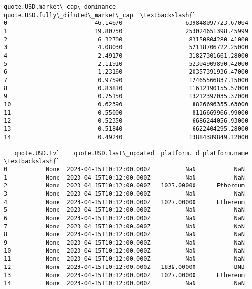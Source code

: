 \documentclass[11pt]{article}
\begin{document}
\begin{tcolorbox}[breakable, size=fbox, boxrule=.5pt, pad at break*=1mm, opacityfill=0]
\begin{Verbatim}[commandchars=\\\{\}]
    quote.USD.market\_cap\_dominance  quote.USD.fully\_diluted\_market\_cap  \textbackslash{}
0                         46.14670                  639848097723.67004
1                         19.80750                  253024651398.45999
2                          6.32700                   83150804280.41000
3                          4.08030                   52118706722.25000
4                          2.49170                   31827301661.28000
5                          2.11910                   52304909890.42000
6                          1.23160                   20357391936.47000
7                          0.97590                   12465566837.15000
8                          0.83810                   11612190155.57000
9                          0.75150                   13212397035.37000
10                         0.62390                    8826696355.63000
11                         0.55000                    8116669966.99000
12                         0.52350                    6686244056.93000
13                         0.51840                    6622404295.28000
14                         0.49240                   13884389849.12000

   quote.USD.tvl    quote.USD.last\_updated  platform.id platform.name  \textbackslash{}
0           None  2023-04-15T10:12:00.000Z          NaN           NaN
1           None  2023-04-15T10:12:00.000Z          NaN           NaN
2           None  2023-04-15T10:12:00.000Z   1027.00000      Ethereum
3           None  2023-04-15T10:12:00.000Z          NaN           NaN
4           None  2023-04-15T10:12:00.000Z   1027.00000      Ethereum
5           None  2023-04-15T10:12:00.000Z          NaN           NaN
6           None  2023-04-15T10:12:00.000Z          NaN           NaN
7           None  2023-04-15T10:12:00.000Z          NaN           NaN
8           None  2023-04-15T10:12:00.000Z          NaN           NaN
9           None  2023-04-15T10:12:00.000Z          NaN           NaN
10          None  2023-04-15T10:12:00.000Z          NaN           NaN
11          None  2023-04-15T10:12:00.000Z          NaN           NaN
12          None  2023-04-15T10:12:00.000Z   1839.00000           BNB
13          None  2023-04-15T10:12:00.000Z   1027.00000      Ethereum
14          None  2023-04-15T10:12:00.000Z          NaN           NaN


\end{Verbatim}
\end{tcolorbox}
\end{document}
